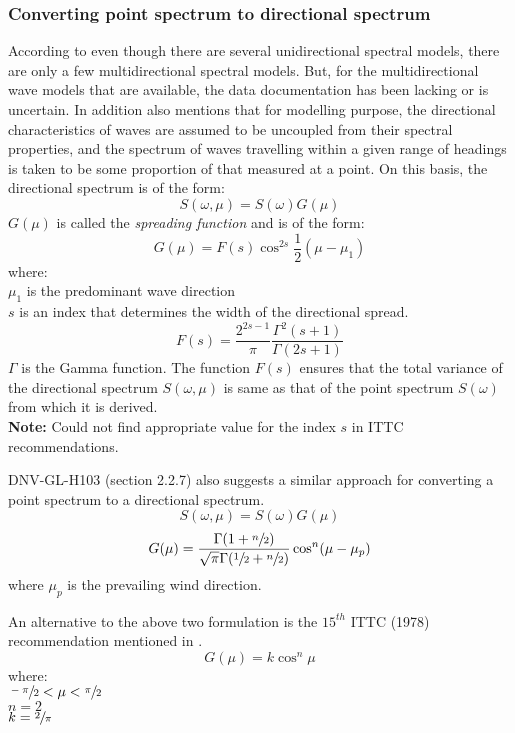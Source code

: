 \subsubsection{Converting point spectrum to directional spectrum}
According to \cite{stansberg2002specialist} even though there are several
unidirectional spectral models, there are only a few multidirectional spectral
models. But, for the multidirectional wave models that are available, the 
data documentation has been lacking or is uncertain. In addition
\cite{stansberg2002specialist} also mentions that for modelling purpose, the
directional characteristics of waves are assumed to be uncoupled from their
spectral properties, and the spectrum of waves travelling within a given range
of headings is taken to be some proportion of that measured at a point. On this
basis, the directional spectrum is of the form:
\begin{equation}
  S(\omega, \mu) = S(\omega) G(\mu)
\end{equation}
$G(\mu)$ is called the \textit{spreading function} and is of the form:
\begin{equation}
  G(\mu) = F(s) \cos^{2s} \frac{1}{2} (\mu - \mu_1)
\end{equation}
where:\\ 
$\mu_1$ is the predominant wave direction  \\
$s$ is an index that determines the width of the directional spread.
\begin{equation}
  F(s) = \frac{2^{2s - 1}}{\pi} \frac{\Gamma^2 (s+1)}{\Gamma (2s + 1)}
\end{equation}
$\Gamma$ is the Gamma function. The function $F(s)$ ensures that the total
variance of the directional spectrum $S(\omega, \mu)$ is same as that of the
point spectrum $S(\omega)$ from which it is derived.\\
\textbf{Note:} Could not find appropriate value for the index $s$ in ITTC 
recommendations.


DNV-GL-H103 \cite{dnv2014recommended} (section 2.2.7) also suggests a similar
approach for converting a point spectrum to a directional spectrum. 
\begin{equation}
  S(\omega, \mu) = S(\omega) G(\mu)
\end{equation}
\begin{equation}
  G(\mu) = \frac{\Gamma(1 + \sfrac{n}{2})}
                {\sqrt{\pi} \Gamma(\sfrac{1}{2} + \sfrac{n}{2})}
           \cos^n (\mu - \mu_p)
\end{equation}
where $\mu_p$ is the prevailing wind direction.

An alternative to the above two formulation is the $15^{th}$ ITTC (1978) 
recommendation mentioned in \cite{lewis1988principles}.
\begin{equation}
  G(\mu) = k \cos^n \mu
\end{equation}
where: \\ 
$\sfrac{-\pi}{2} < \mu < \sfrac{\pi}{2}$\\ 
$n = 2$ \\
$k = \sfrac{2}{\pi}$



